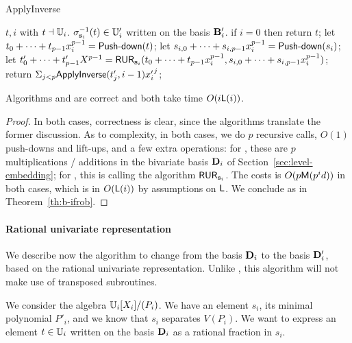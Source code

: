 \begin{algorithm}
  \caption{ApplyInverse} 
  \begin{algorithmic}[1]
    \REQUIRE $t,i$ with $t \dashv \mathbb{U}_i$.
    \ENSURE $\sigma_{\mathbf{s}_i}^{-1}(t)\in \mathbb{U}'_i$ written on the basis $\mathbf{B}'_i$.
    \STATE if $i=0$ then return $t$;
    \STATE let $t_0 + \cdots + t_{p-1}x_i^{p-1} = \text{{\sf Push-down}}(t)$;
    \STATE let $s_{i,0}+\cdots+s_{i,p-1}x_i^{p-1}=\text{{\sf Push-down}}(s_i)$;
    \STATE let $t'_0 + \cdots + t'_{p-1}X^{p-1} = {\sf RUR}_{\mathbf{s}_i}
  (t_0 + \cdots + t_{p-1}x_i^{p-1}, s_{i,0}+\cdots+s_{i,p-1}x_i^{p-1})$;
  \STATE return $\Sigma_{j < p} {\sf ApplyInverse}(t'_j, i-1) {x'_i}^j$;
\end{algorithmic}
\end{algorithm}

\begin{proposition}\label{Prop:apply}
  Algorithms  and  are correct
  and both take time $O(i\mathsf{L}(i))$.
\end{proposition}
\begin{proof}
  In both cases, correctness is clear, since the algorithms translate
  the former discussion. As to complexity, in both cases, we do $p$
  recursive calls, $O(1)$ push-downs and lift-ups, and a few extra
  operations: for , these are $p$
  multiplications / additions in the bivariate basis $\mathbf{D}_i$ of
  Section~\ref{sec:level-embedding}; for , this is
  calling the algorithm ${\sf RUR}_{\mathbf{s}_i}$.  The costs is
  $O(p\mathsf{M}(p^id))$ in both cases, which is in $O(\mathsf{L}(i))$ by
  assumptions on $\mathsf{L}$. We conclude as in Theorem~\ref{th:b-ifrob}.
\end{proof}


\paragraph{Rational univariate representation}
We describe now the algorithm to change from the basis $\mathbf{D}_i$
to the basis $\mathbf{D}_i'$, based on the rational univariate
representation. Unlike , this algorithm will not make use
of transposed subroutines.

We consider the algebra $\mathbb{U}_i[X_i]/(P_i)$. We have an element $s_i$,
its minimal polynomial $P'_i$, and we know that $s_i$ separates
$V(P_i)$. We want to express an element $t\in\mathbb{U}_i$ written on the
basis $\mathbf{D}_i$ as a rational fraction in $s_i$.

